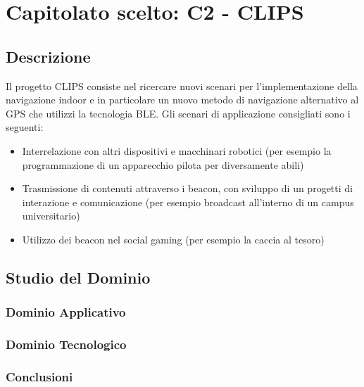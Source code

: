 \section{Capitolato scelto: C2 - CLIPS}

\subsection{Descrizione}

Il progetto CLIPS consiste nel ricercare nuovi scenari per l'implementazione della navigazione indoor e in particolare 
un nuovo metodo di navigazione alternativo al GPS che utilizzi la tecnologia BLE.
Gli scenari di applicazione consigliati sono i seguenti:
\begin{itemize}
	\item Interrelazione con altri dispositivi e macchinari robotici (per esempio la programmazione di un apparecchio pilota per diversamente abili)
	\item Trasmissione di contenuti attraverso i beacon, con sviluppo di un progetti di interazione e comunicazione (per esempio broadcast all'interno di un campus universitario)
	\item Utilizzo dei beacon nel social gaming (per esempio la caccia al tesoro)
\end{itemize}

\subsection{Studio del Dominio}
\subsubsection{Dominio Applicativo}
\subsubsection{Dominio Tecnologico}
\subsubsection{Conclusioni}